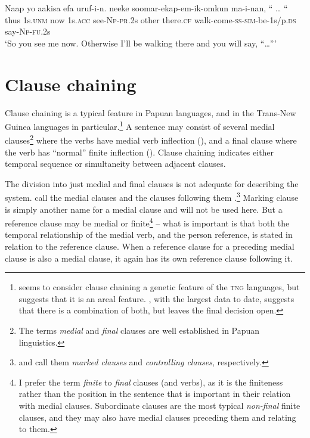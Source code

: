 \ea%
\label{ex:8:x1428}
\gll Naap  yo  aakisa  efa  uruf-i-n.   neeke soomar-ekap-em-ik-omkun  ma-i-nan,  ``  {\dots } ``\\
thus  1s.\textsc{unm} now 1s.\textsc{acc} see-\textsc{Np}-\textsc{pr}.2s other there.\textsc{cf} walk-come-\textsc{ss}-\textsc{sim}-be-1s/p.\textsc{ds} say-\textsc{Np}-\textsc{fu}.2s\\
\glt`So you see me now. Otherwise I'll be walking there and you will say, ``{\dots}'''
\z
{}


\section{Clause chaining} \label{sec:8.2}

Clause chaining is a typical feature in Papuan languages, and in the Trans-New Guinea languages in particular.\footnote{\citet[36]{Wurm1982} seems to consider clause chaining a genetic feature of the \textsc{tng} languages, but \citet[xlvii]{Haiman1980} suggests that it is an areal feature. \citet[122]{Roberts1997}, with the largest data to date, suggests that there is a combination of both, but leaves the final decision open.}  A sentence may consist of several medial clauses\footnote{The terms \textit{medial} and \textit{final} clauses are well established in Papuan linguistics. }   where the verbs have medial verb inflection (), and a final clause where the verb has ``normal'' finite inflection (). Clause chaining indicates either temporal sequence or simultaneity between adjacent clauses.

The division into just medial and final clauses is not adequate for describing the system. \citet[xii]{HaimanEtAl1983} call the medial clauses  and the clauses following them .\footnote{\citet{Comrie1983} and \citet{Roberts1997} call them \textit{marked clauses} and \textit{controlling clauses}, respectively.} Marking clause is simply another name for a medial clause and will not be used here. But a reference clause may be medial or finite\footnote{I prefer the term \textit{finite} to \textit{final} clauses (and verbs), as it is the finiteness rather than the position in the sentence that is important in their relation with medial clauses. Subordinate clauses are the most typical \textit{non-final} finite clauses, and they may also have medial clauses preceding them and relating to them.} -- what is important is that both the temporal relationship of the medial verb, and the person reference, is stated in relation to the reference clause. When a reference clause for a preceding medial clause is also a medial clause, it again has its own reference clause following it.

